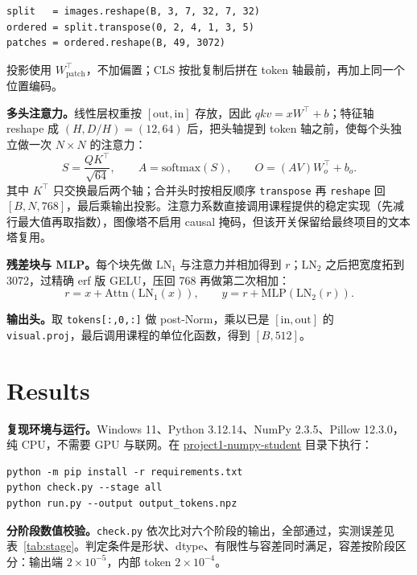 \documentclass[a4paper,12pt]{article}
\begin{document}
\begin{verbatim}
split   = images.reshape(B, 3, 7, 32, 7, 32)
ordered = split.transpose(0, 2, 4, 1, 3, 5)
patches = ordered.reshape(B, 49, 3072)
\end{verbatim}

投影使用 $W_{\mathrm{patch}}^{\top}$，不加偏置；CLS 按批复制后拼在 token 轴最前，再加上同一个位置编码。

\textbf{多头注意力。}线性层权重按 $[\mathrm{out},\mathrm{in}]$ 存放，因此 $qkv=xW^{\top}+b$；特征轴 reshape 成 $(H,D/H)=(12,64)$ 后，把头轴提到 token 轴之前，使每个头独立做一次 $N\times N$ 的注意力：
\[
S=\frac{QK^{\top}}{\sqrt{64}},\qquad A=\mathrm{softmax}(S),\qquad O=(AV)W_o^{\top}+b_o .
\]
其中 $K^{\top}$ 只交换最后两个轴；合并头时按相反顺序 \texttt{transpose} 再 \texttt{reshape} 回 $[B,N,768]$，最后乘输出投影。注意力系数直接调用课程提供的稳定实现（先减行最大值再取指数），图像塔不启用 causal 掩码，但该开关保留给最终项目的文本塔复用。

\textbf{残差块与 MLP。}每个块先做 $\mathrm{LN}_1$ 与注意力并相加得到 $r$；$\mathrm{LN}_2$ 之后把宽度拓到 3072，过精确 erf 版 GELU，压回 768 再做第二次相加：
\[
r=x+\mathrm{Attn}\!\left(\mathrm{LN}_1(x)\right),\qquad
y=r+\mathrm{MLP}\!\left(\mathrm{LN}_2(r)\right).
\]

\textbf{输出头。}取 \texttt{tokens[:,0,:]} 做 post-Norm，乘以已是 $[\mathrm{in},\mathrm{out}]$ 的 \texttt{visual.proj}，最后调用课程的单位化函数，得到 $[B,512]$。

\section{Results}

\textbf{复现环境与运行。}Windows 11、Python 3.12.14、NumPy 2.3.5、Pillow 12.3.0，纯 CPU，不需要 GPU 与联网。在 \url{project1-numpy-student} 目录下执行：

\begin{verbatim}
python -m pip install -r requirements.txt
python check.py --stage all
python run.py --output output_tokens.npz
\end{verbatim}

\textbf{分阶段数值校验。}\texttt{check.py} 依次比对六个阶段的输出，全部通过，实测误差见表~\ref{tab:stage}。判定条件是形状、dtype、有限性与容差同时满足，容差按阶段区分：输出端 $2\times10^{-5}$，内部 token $2\times10^{-4}$。
\end{document}
